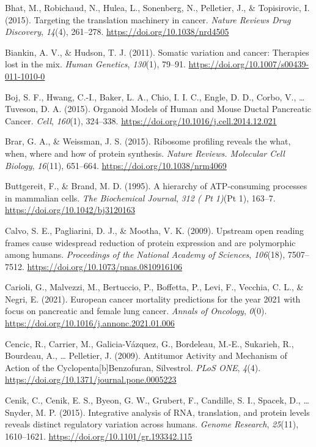 \documentclass[12pt,openany]{book}
\begin{document}
\hypertarget{ref-Bhat2015}{}
Bhat, M., Robichaud, N., Hulea, L., Sonenberg, N., Pelletier, J., \&
Topisirovic, I. (2015). Targeting the translation machinery in cancer.
\emph{Nature Reviews Drug Discovery}, \emph{14}(4), 261--278.
\url{https://doi.org/10.1038/nrd4505}

\hypertarget{ref-Biankin2011}{}
Biankin, A. V., \& Hudson, T. J. (2011). Somatic variation and cancer:
Therapies lost in the mix. \emph{Human Genetics}, \emph{130}(1), 79--91.
\url{https://doi.org/10.1007/s00439-011-1010-0}

\hypertarget{ref-Boj2015}{}
Boj, S. F., Hwang, C.-I., Baker, L. A., Chio, I. I. C., Engle, D. D.,
Corbo, V., \ldots{} Tuveson, D. A. (2015). Organoid Models of Human and
Mouse Ductal Pancreatic Cancer. \emph{Cell}, \emph{160}(1), 324--338.
\url{https://doi.org/10.1016/j.cell.2014.12.021}

\hypertarget{ref-Brar2015}{}
Brar, G. A., \& Weissman, J. S. (2015). Ribosome profiling reveals the
what, when, where and how of protein synthesis. \emph{Nature Reviews.
Molecular Cell Biology}, \emph{16}(11), 651--664.
\url{https://doi.org/10.1038/nrm4069}

\hypertarget{ref-Buttgereit1995}{}
Buttgereit, F., \& Brand, M. D. (1995). A hierarchy of ATP-consuming
processes in mammalian cells. \emph{The Biochemical Journal}, \emph{312
( Pt 1)}(Pt 1), 163--7. \url{https://doi.org/10.1042/bj3120163}

\hypertarget{ref-Calvo2009}{}
Calvo, S. E., Pagliarini, D. J., \& Mootha, V. K. (2009). Upstream open
reading frames cause widespread reduction of protein expression and are
polymorphic among humans. \emph{Proceedings of the National Academy of
Sciences}, \emph{106}(18), 7507--7512.
\url{https://doi.org/10.1073/pnas.0810916106}

\hypertarget{ref-Carioli2021}{}
Carioli, G., Malvezzi, M., Bertuccio, P., Boffetta, P., Levi, F.,
Vecchia, C. L., \& Negri, E. (2021). European cancer mortality
predictions for the year 2021 with focus on pancreatic and female lung
cancer. \emph{Annals of Oncology}, \emph{0}(0).
\url{https://doi.org/10.1016/j.annonc.2021.01.006}

\hypertarget{ref-Cencic2009}{}
Cencic, R., Carrier, M., Galicia-Vázquez, G., Bordeleau, M.-E.,
Sukarieh, R., Bourdeau, A., \ldots{} Pelletier, J. (2009). Antitumor
Activity and Mechanism of Action of the Cyclopenta{[}b{]}Benzofuran,
Silvestrol. \emph{PLoS ONE}, \emph{4}(4).
\url{https://doi.org/10.1371/journal.pone.0005223}

\hypertarget{ref-Cenik2015}{}
Cenik, C., Cenik, E. S., Byeon, G. W., Grubert, F., Candille, S. I.,
Spacek, D., \ldots{} Snyder, M. P. (2015). Integrative analysis of RNA,
translation, and protein levels reveals distinct regulatory variation
across humans. \emph{Genome Research}, \emph{25}(11), 1610--1621.
\url{https://doi.org/10.1101/gr.193342.115}
\end{document}
